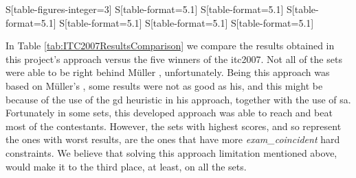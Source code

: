 \begin{table*}[!p]
\begin{tabular}{%
	S[table-figures-integer=3]%
	S[table-format=5.1]%
	S[table-format=5.1]%
	S[table-format=5.1]%
	S[table-format=5.1]%
	S[table-format=5.1]%
	S[table-format=5.1]%
    }
\bottomrule

\end{tabular}
\label{tab:20tests}
\end{table*}In Table \ref{tab:ITC2007ResultsComparison} we compare the results obtained in this project's approach versus the five winners of the \gls{itc2007}. Not all of the sets were able to be right behind M\"{u}ller \cite{Mueller2009}, unfortunately. Being this approach was based on M\"{u}ller's \cite{Mueller2009}, some results were not as good as his, and this might be because of the use of the \gls{gd} heuristic in his approach, together with the use of \gls{sa}. Fortunately in some sets, this developed approach was able to reach and beat most of the contestants. However, the sets with highest scores, and so represent the ones with worst results, are the ones that have more \textit{exam\_coincident} hard constraints. We believe that solving this approach limitation mentioned above, would make it to the third place, at least, on all the sets.\\
\\
